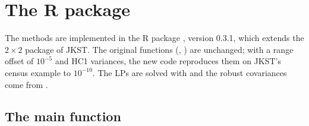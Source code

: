 \section{The R package}\label{sec:package}

The methods are implemented in the R package , version 0.3.1,
which extends the $2\times2$ package of JKST. The original functions
(, ) are unchanged; with a range
offset of $10^{-5}$ and HC1 variances, the new code reproduces them on JKST's
census example to $10^{-10}$. The LPs are solved with  and the
robust covariances come from .

\subsection{The main function}


